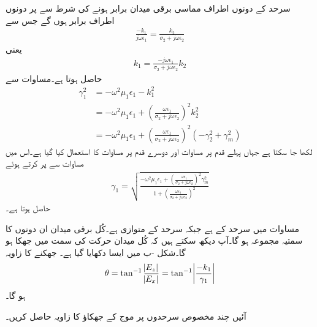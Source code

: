 سرحد کے دونوں اطراف مماسی  برقی میدان برابر ہونے کی شرط سے  پر دونوں اطراف  برابر ہوں گے جس سے
\begin{align*}
\frac{-k_1}{j\omega \epsilon_1}=\frac{k_2}{\sigma_2+j\omega \epsilon_2}
\end{align*}
یعنی
\begin{align}\label{مساوات_مویج_سطحی_موج_مستقل_ت}
k_1=\frac{-j\omega \epsilon_1}{\sigma_2+j\omega \epsilon_2}k_2
\end{align}
حاصل ہوتا ہے۔مساوات  سے 
\begin{align*}
\gamma_1^2&=-\omega^2 \mu_1 \epsilon_1-k_1^2\\
&=-\omega^2 \mu_1 \epsilon_1+\left(\frac{\omega \epsilon_1}{\sigma_2+j\omega\epsilon_2}\right)^2 k_2^2\\
&=-\omega^2 \mu_1 \epsilon_1+\left(\frac{\omega \epsilon_1}{\sigma_2+j\omega\epsilon_2}\right)^2\left(-\gamma_2^2+\gamma_m^2 \right)
\end{align*}
لکھا جا سکتا ہے جہاں پہلے قدم پر مساوات  اور دوسرے قدم پر مساوات  کا استعمال کیا گیا ہے۔اس میں مساوات  سے  پر کرتے ہوئے
\begin{align}
\gamma_1=\sqrt{\frac{-\omega^2 \mu_1 \epsilon_1+\left(\frac{\omega \epsilon_1}{\sigma_2+j\omega\epsilon_2}\right)^2\gamma_m^2}{1+\left(\frac{\omega \epsilon_1}{\sigma_2+j\omega\epsilon_2}\right)^2}}
\end{align}
حاصل ہوتا ہے۔

مساوات  میں  سرحد کے  ہے جبکہ  سرحد کے متوازی ہے۔کُل برقی میدان ان دونوں کا سمتیہ مجموعہ ہو گا۔آپ دیکھ سکتے ہیں کہ کُل میدان حرکت کی سمت میں جھکا ہو گا۔شکل -ب میں ایسا دکھایا گیا ہے۔ جھکنے کا زاویہ
\begin{align}
\theta=\tan^{-1} \frac{\abs{E_z}}{\abs{E_x}}=\tan^{-1}\abs{\frac{-k_1}{\gamma_1}}
\end{align}
ہو گا۔

آئیں چند مخصوص سرحدوں پر موج کے جھکاؤ کا زاویہ حاصل کریں۔

